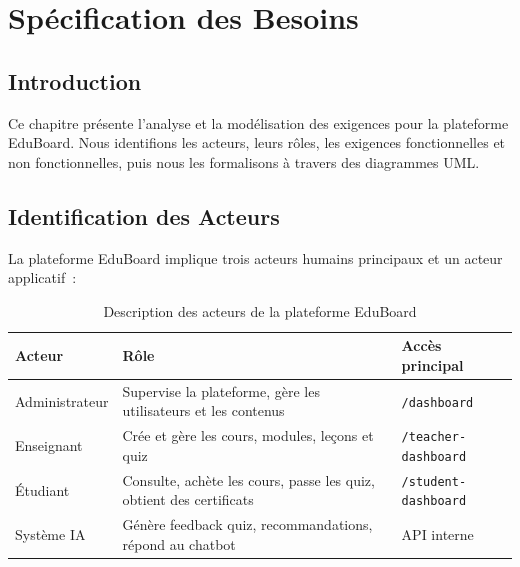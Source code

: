 \chapter{Spécification des Besoins}

\section*{Introduction}

Ce chapitre présente l'analyse et la modélisation des exigences pour la plateforme
EduBoard. Nous identifions les acteurs, leurs rôles, les exigences fonctionnelles et
non fonctionnelles, puis nous les formalisons à travers des diagrammes \ac{UML}.

\section{Identification des Acteurs}

La plateforme EduBoard implique trois acteurs humains principaux et un acteur
applicatif~:

\begin{table}[H]
  \centering
  \caption{Description des acteurs de la plateforme EduBoard}
  \label{tab:acteurs}
  \begin{tabularx}{\textwidth}{|l|X|l|}
    \hline
    \textbf{Acteur} & \textbf{Rôle} & \textbf{Accès principal} \\
    \hline
    Administrateur & Supervise la plateforme, gère les utilisateurs et les contenus & \texttt{/dashboard} \\
    \hline
    Enseignant     & Crée et gère les cours, modules, leçons et quiz               & \texttt{/teacher-dashboard} \\
    \hline
    Étudiant       & Consulte, achète les cours, passe les quiz, obtient des certificats & \texttt{/student-dashboard} \\
    \hline
    Système \ac{IA}     & Génère feedback quiz, recommandations, répond au chatbot       & API interne \\
    \hline
  \end{tabularx}
\end{table}

